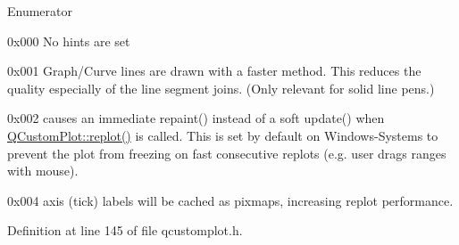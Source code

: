 \begin{Desc}
\item[Enumerator]\par
\begin{description}
\item[{\em 
\hypertarget{namespace_q_c_p_a5400e5fcb9528d92002ddb938c1f4ef4ab7283c5bfc1ba9e597015389880bda42}{ph\-None}\label{namespace_q_c_p_a5400e5fcb9528d92002ddb938c1f4ef4ab7283c5bfc1ba9e597015389880bda42}
}]{\ttfamily 0x000} No hints are set \item[{\em 
\hypertarget{namespace_q_c_p_a5400e5fcb9528d92002ddb938c1f4ef4aa5fd227bc878c56ad2a87ea32c74ee4d}{ph\-Fast\-Polylines}\label{namespace_q_c_p_a5400e5fcb9528d92002ddb938c1f4ef4aa5fd227bc878c56ad2a87ea32c74ee4d}
}]{\ttfamily 0x001} Graph/\-Curve lines are drawn with a faster method. This reduces the quality especially of the line segment joins. (Only relevant for solid line pens.) \item[{\em 
\hypertarget{namespace_q_c_p_a5400e5fcb9528d92002ddb938c1f4ef4aa3090dafa0e0f9a28c579c79d6c2d283}{ph\-Force\-Repaint}\label{namespace_q_c_p_a5400e5fcb9528d92002ddb938c1f4ef4aa3090dafa0e0f9a28c579c79d6c2d283}
}]{\ttfamily 0x002} causes an immediate repaint() instead of a soft update() when \hyperlink{class_q_custom_plot_a563540b54b2a09c8ef092d42e9621f42}{Q\-Custom\-Plot\-::replot()} is called. This is set by default on Windows-\/\-Systems to prevent the plot from freezing on fast consecutive replots (e.\-g. user drags ranges with mouse). \item[{\em 
\hypertarget{namespace_q_c_p_a5400e5fcb9528d92002ddb938c1f4ef4a8e9cfe5ee0c5cd36dd7accf9739aff65}{ph\-Cache\-Labels}\label{namespace_q_c_p_a5400e5fcb9528d92002ddb938c1f4ef4a8e9cfe5ee0c5cd36dd7accf9739aff65}
}]{\ttfamily 0x004} axis (tick) labels will be cached as pixmaps, increasing replot performance. \end{description}
\end{Desc}


Definition at line 145 of file qcustomplot.\-h.



